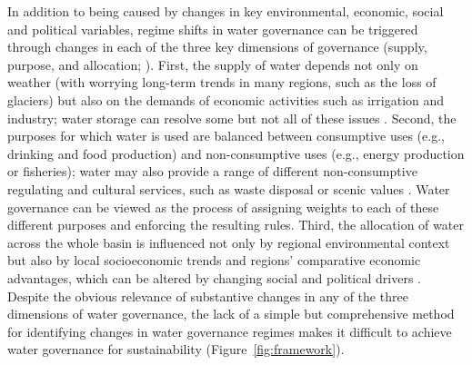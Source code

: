 \documentclass[9pt, twocolumn, twoside, lineno]{pnas-new}
\begin{document}
In addition to being caused by changes in key environmental, economic, social and political variables, regime shifts in water governance can be triggered through changes in each of the three key dimensions of governance (supply, purpose, and allocation;
\cite{undpwatergovernancefacility2013,undpwatergovernancefacility2015,undpwatergovernancefacility2016}).
First, the supply of water depends not only on weather (with worrying long-term trends in many regions, such as the loss of glaciers) but also on the demands of economic activities such as irrigation and industry; water storage can resolve some but not all of these issues 
\cite{greveGlobalAssessmentWater2018, wada2017, qin2019}.
Second, the purposes for which water is used are balanced between consumptive uses (e.g., drinking and food production) and non-consumptive uses (e.g., energy production or fisheries); water may also provide a range of different non-consumptive regulating and cultural services, such as waste disposal or scenic values 
\cite{liu2017, florke2018}.
Water governance can be viewed as the process of assigning weights to each of these different purposes and enforcing the resulting rules. Third, the allocation of water across the whole basin is influenced not only by regional environmental context but also by local socioeconomic trends and regions’ comparative economic advantages, which can be altered by changing social and political drivers
\cite{roobavannan2017,speed2013}.
Despite the obvious relevance of substantive changes in any of the three dimensions of water governance, the lack of a simple but comprehensive method for identifying changes in water governance regimes makes it difficult to achieve water governance for sustainability (Figure~\ref{fig:framework}).
\end{document}
